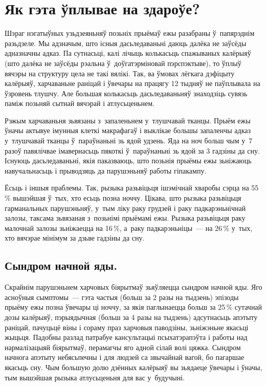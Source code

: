\section{Як гэта ўплывае на здароўе?}

Шэраг нэгатыўных узьдзеяньняў позьніх прыёмаў ежы разабраны ў~папярэднім разьдзеле. Мы адзначым, што існыя дасьледаваньні даюць далёка не заўсёды адназначны адказ. Па сутнасьці, калі лічыць колькасьць спажываных калёрыяў (што далёка не заўсёды рэальна ў~доўгатэрміновай пэрспэктыве), то ўплыў вячэры на структуру цела не такі вялікі. Так, ва ўмовах лёгкага дэфіцыту калёрыяў, харчаваньне раніцай і ўвечары на працягу 12 тыдняў не паўплывала на ўзровень тлушчу. Але большая колькасьць дасьледаваньняў знаходзіць сувязь паміж позьняй сытнай вячэрай і атлусьценьнем.

Рэжым харчаваньня зьвязаны з~запаленьнем у~тлушчавай тканцы. Прыём ежы ўначы актывуе імунныя клеткі макрафагаў і выклікае большы запаленчы адказ у~тлушчавай тканцы ў~параўнаньні зь ядой удзень. Яда на ноч больш чым у~7 разоў павялічвае імавернасьць пякоткі ў~параўнаньні зь ядой за 3 гадзіны да сну. Існуюць дасьледаваньні, якія паказваюць, што позьнія прыёмы ежы зьніжаюць навучальнасьць і прыводзяць да парушэньняў работы гіпакампу.

Ёсьць і іншыя праблемы. Так, рызыка разьвіцьця ішэмічнай хваробы сэрца на 55\,\% вышэйшая ў~тых, хто есьць позна ноччу. Цікава, што рызыка разьвіцьця гарманальных парушэньняў, у~тым ліку раку грудзей і раку падкарэньнічнай залозы, таксама зьвязаная з~позьнімі прыёмамі ежы. Рызыка разьвіцьця раку малочнай залозы зьніжаецца на 16\,\%, а~раку падкарэньніцы~--- на 26\,\% у~тых, хто вячэрае мінімум за дзьве гадзіны да сну.

\subsection{Сындром начной яды.}
Скрайнім парушэньнем харчовых біярытмаў зьяўляецца сындром начной яды. Яго асноўныя сымптомы~--- гэта частыя (больш за 2 разы на тыдзень) эпізоды прыёму ежы позна ўвечары ці ноччу, за якія паглынаецца больш за 25\,\% сутачнай дозы калёрыяў, пэрыядычная (больш за 4 разы на тыдзень) адсутнасьць апэтыту раніцай, пачуцьцё віны і сораму праз харчовыя паводзіны, зьніжэньне якасьці жыцьця. Падобны разлад патрабуе кансультацыі псыхатэрапэўта і работы над нармалізацыяй біярытмаў, перамагчы яго адной сілай волі цяжка. Сындром начнога апэтыту небясьпечны і для людзей са звычайнай вагой, бо пагаршае якасьць сну. Чым большую долю дзённых калёрыяў вы зьядаеце ўвечары і ўначы, тым вышэйшая рызыка атлусьценьня для вас у~будучыні.

